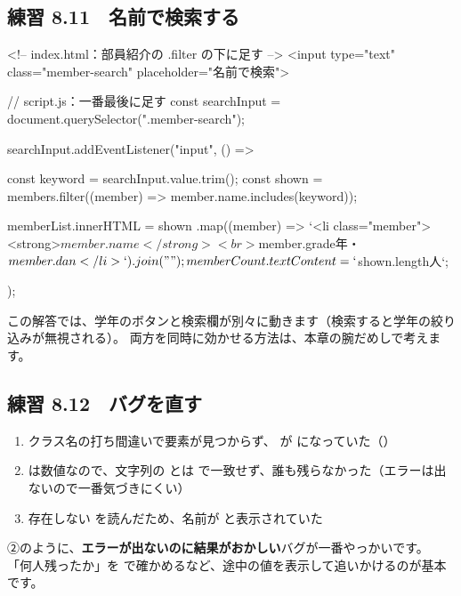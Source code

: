 \subsection*{練習 8.11　名前で検索する}
\begin{Piton}[language=code]
<!-- index.html：部員紹介の .filter の下に足す -->
<input type="text" class="member-search" placeholder="名前で検索">
\end{Piton}
\begin{Piton}[language=code]
// script.js：一番最後に足す
const searchInput = document.querySelector(".member-search");

searchInput.addEventListener("input", () => {
  const keyword = searchInput.value.trim();
  const shown = members.filter((member) => member.name.includes(keyword));

  memberList.innerHTML = shown
    .map((member) => `<li class="member"><strong>${member.name}</strong><br>${member.grade}年・${member.dan}</li>`)
    .join("");
  memberCount.textContent = `${shown.length}人`;
});
\end{Piton}
この解答では、学年のボタンと検索欄が別々に動きます（検索すると学年の絞り込みが無視される）。
両方を同時に効かせる方法は、本章の腕だめしで考えます。

\subsection*{練習 8.12　バグを直す}
\begin{enumerate}
  \item クラス名の打ち間違いで要素が見つからず、 が  になっていた（）
  \item {} は数値なので、文字列の  とは \code{===} で一致せず、誰も残らなかった（エラーは出ないので一番気づきにくい）
  \item 存在しない  を読んだため、名前が  と表示されていた
\end{enumerate}
②のように、\textbf{エラーが出ないのに結果がおかしい}バグが一番やっかいです。
「何人残ったか」を  で確かめるなど、途中の値を表示して追いかけるのが基本です。
